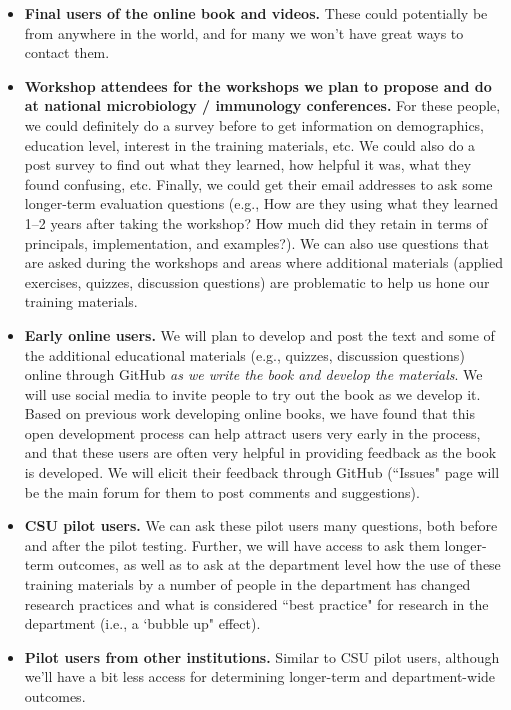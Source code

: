\documentclass[pdftex,english,11pt,parskip=half]{scrartcl}
\begin{document}
\begin{itemize}
\item \textbf{Final users of the online book and videos.} These could potentially be from anywhere in the world, and for many we won't have great ways to contact them. 
\item \textbf{Workshop attendees for the workshops we plan to propose and do at national microbiology / immunology conferences.} For these people, we could definitely do a survey before to get information on demographics, education level, interest in the training materials, etc. We could also do a post survey to find out what they learned, how helpful it was, what they found confusing, etc. Finally, we could get their email addresses to ask some longer-term evaluation questions (e.g., How are they using what they learned 1--2 years after taking the workshop? How much did they retain in terms of principals, implementation, and examples?). We can also use questions that are asked during the workshops and areas where additional materials (applied exercises, quizzes, discussion questions) are problematic to help us hone our training materials.
\item \textbf{Early online users.} We will plan to develop and post the text and some of the additional educational materials (e.g., quizzes, discussion questions) online through GitHub \textit{as we write the book and develop the materials}. We will use social media to invite people to try out the book as we develop it. Based on previous work developing online books, we have found that this open development process can help attract users very early in the process, and that these users are often very helpful in providing feedback as the book is developed. We will elicit their feedback through GitHub (``Issues" page will be the main forum for them to post comments and suggestions).
\item \textbf{CSU pilot users.} We can ask these pilot users many questions, both before and after the pilot testing. Further, we will have access to ask them longer-term outcomes, as well as to ask at the department level how the use of these training materials by a number of people in the department has changed research practices and what is considered ``best practice" for research in the department (i.e., a `bubble up" effect).
\item \textbf{Pilot users from other institutions.} Similar to CSU pilot users, although we'll have a bit less access for determining longer-term and department-wide outcomes.
\end{itemize}
    
\end{document}
